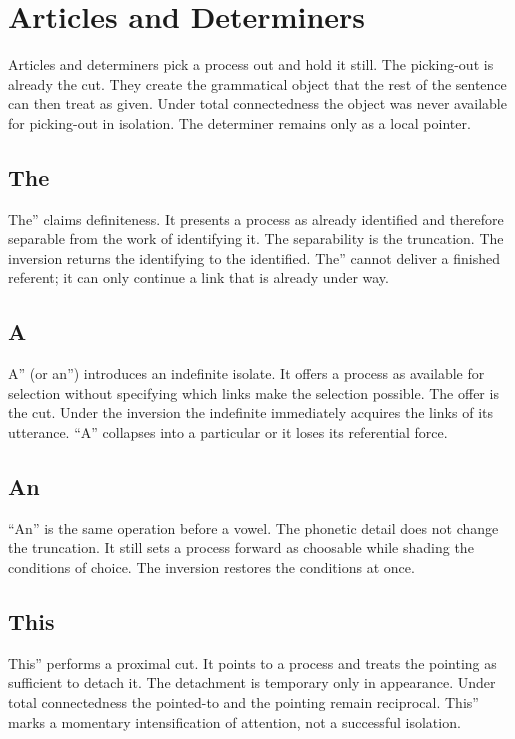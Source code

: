 \documentclass[11pt,a4paper]{article}
\begin{document}
\section{Articles and Determiners}

Articles and determiners pick a process out and hold it still. The picking-out is already the cut. They create the grammatical object that the rest of the sentence can then treat as given. Under total connectedness the object was never available for picking-out in isolation. The determiner remains only as a local pointer.

\subsection{The} The'' claims definiteness. It presents a process as already identified and therefore separable from the work of identifying it. The separability is the truncation. The inversion returns the identifying to the identified. The'' cannot deliver a finished referent; it can only continue a link that is already under way.

\subsection{A} A'' (or an'') introduces an indefinite isolate. It offers a process as available for selection without specifying which links make the selection possible. The offer is the cut. Under the inversion the indefinite immediately acquires the links of its utterance. ``A'' collapses into a particular or it loses its referential force.

\subsection{An} ``An'' is the same operation before a vowel. The phonetic detail does not change the truncation. It still sets a process forward as choosable while shading the conditions of choice. The inversion restores the conditions at once.

\subsection{This} This'' performs a proximal cut. It points to a process and treats the pointing as sufficient to detach it. The detachment is temporary only in appearance. Under total connectedness the pointed-to and the pointing remain reciprocal. This'' marks a momentary intensification of attention, not a successful isolation.
\end{document}
